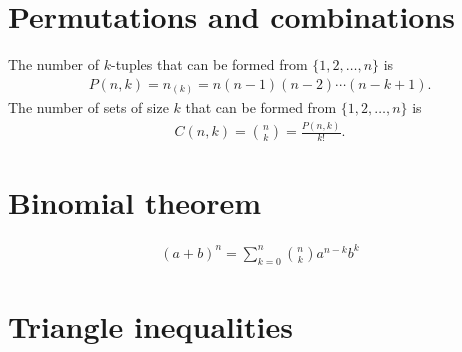 \section{Permutations and combinations}

\begin{theorem*}
  The number of $k$-tuples that can be formed from $\{1, 2, \ldots, n\}$ is
  \begin{align*}
    P(n, k) = n_{(k)} = n(n-1)(n-2)\cdots(n-k+1).
  \end{align*}
  The number of sets of size $k$ that can be formed from $\{1, 2, \ldots, n\}$ is
  \begin{align*}
    C(n, k) = {n \choose k} = \frac{P(n, k)}{k!}.
  \end{align*}
\end{theorem*}

\section{Binomial theorem}
\begin{align*}
  (a + b)^n = \sum_{k=0}^n{n \choose k}a^{n-k}b^k
\end{align*}

\section{Triangle inequalities}

